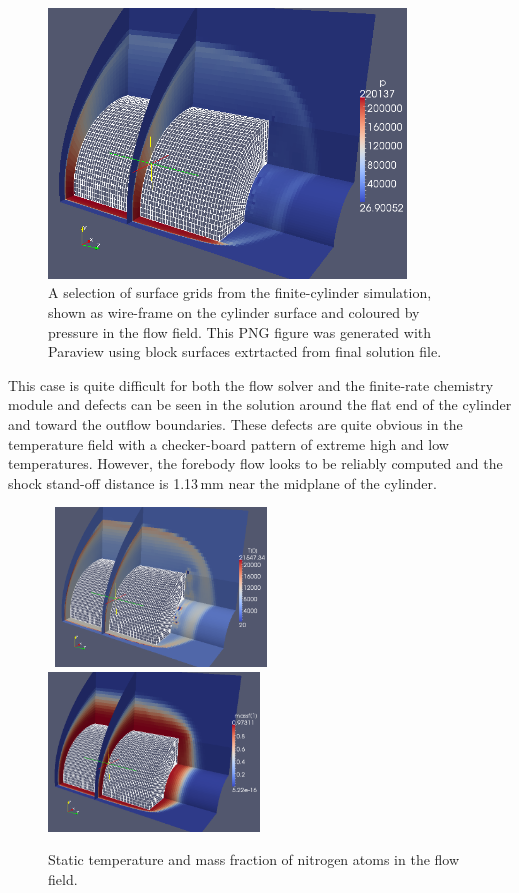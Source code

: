 \begin{figure}[htbp]
\begin{center}
\includegraphics[width=9.5cm]{../3D/finite-cylinder/finite-cyl-p-with-mesh-aug2010.png}
\end{center}
\caption{A selection of surface grids from the finite-cylinder simulation, 
   shown as wire-frame on the cylinder surface
   and coloured by pressure in the flow field.
   This PNG figure was generated with Paraview using block surfaces extrtacted from final solution file.}
\label{finite-cyl-p-fig}
\end{figure}

\medskip
This case is quite difficult for both the flow solver and the finite-rate chemistry module
and defects can be seen in the solution around the flat end of the cylinder and toward the
outflow boundaries.
These defects are quite obvious in the temperature field with a checker-board pattern of
extreme high and low temperatures.
However, the forebody flow looks to be reliably computed and the shock stand-off distance is
1.13\,mm near the midplane of the cylinder.

\begin{figure}[htbp]
\hbox{
\includegraphics[width=0.5\textwidth]{../3D/finite-cylinder/finite-cyl-T-with-mesh-aug2010.png}
\includegraphics[width=0.5\textwidth]{../3D/finite-cylinder/finite-cyl-N-massf-with-mesh-aug2010.png}
}
\caption{Static temperature and mass fraction of nitrogen atoms in the flow field.}
\label{finite-cyl-T-fig}
\end{figure}



